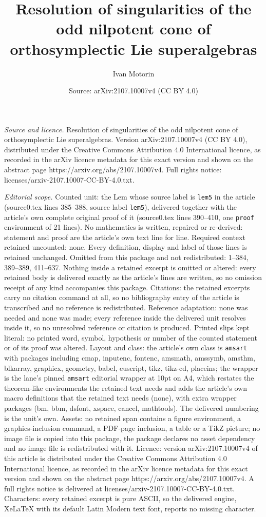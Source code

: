 \documentclass[10pt,a4paper]{amsart}
\title[Resolution of singularities of the odd nilpotent cone of ort]{Resolution of singularities of the odd nilpotent cone of orthosymplectic Lie superalgebras}
\author{Ivan Motorin}
\date{Source: arXiv:2107.10007v4 (CC BY 4.0)}
\begin{document}
\maketitle

\noindent\emph{Source and licence.} Resolution of singularities of the odd nilpotent cone of orthosymplectic Lie superalgebras. Version arXiv:2107.10007v4 (CC BY 4.0), distributed under the Creative Commons Attribution 4.0 International licence, as recorded in the arXiv licence metadata for this exact version and shown on the abstract page https://arxiv.org/abs/2107.10007v4. Full rights notice: licenses/arxiv-2107.10007-CC-BY-4.0.txt.\par\smallskip

\noindent\textit{Editorial scope.} Counted unit: the Lem whose source label is \texttt{lem5} in the article (source0.tex lines 385--388, source label \texttt{lem5}), delivered together with the article's own complete original proof of it (source0.tex lines 390--410, one \texttt{proof} environment of 21 lines). No mathematics is written, repaired or re-derived: statement and proof are the article's own text line for line. Required context retained uncounted: none. Every definition, display and label of those lines is retained unchanged. Omitted from this package and not redistributed: 1--384, 389--389, 411--637. Nothing inside a retained excerpt is omitted or altered: every retained body is delivered exactly as the article's lines are written, so no omission receipt of any kind accompanies this package. Citations: the retained excerpts carry no citation command at all, so no bibliography entry of the article is transcribed and no reference is redistributed. Reference adaptation: none was needed and none was made; every reference inside the delivered unit resolves inside it, so no unresolved reference or citation is produced. Printed slips kept literal: no printed word, symbol, hypothesis or number of the counted statement or of its proof was altered. Layout and class: the article's own class is \texttt{amsart} with packages including cmap, inputenc, fontenc, amsmath, amssymb, amsthm, blkarray, graphicx, geometry, babel, euscript, tikz, tikz-cd, placeins; the wrapper is the lane's pinned \texttt{amsart} editorial wrapper at 10pt on A4, which restates the theorem-like environments the retained text needs and adds the article's own macro definitions that the retained text needs (none), with extra wrapper packages (bm, bbm, dsfont, xspace, cancel, mathtools). The delivered numbering is the unit's own. Assets: no retained span contains a figure environment, a graphics-inclusion command, a PDF-page inclusion, a table or a TikZ picture; no image file is copied into this package, the package declares no asset dependency and no image file is redistributed with it. Licence: version arXiv:2107.10007v4 of this article is distributed under the Creative Commons Attribution 4.0 International licence, as recorded in the arXiv licence metadata for this exact version and shown on the abstract page https://arxiv.org/abs/2107.10007v4. A full rights notice is delivered at licenses/arxiv-2107.10007-CC-BY-4.0.txt. Characters: every retained excerpt is pure ASCII, so the delivered engine, XeLaTeX with its default Latin Modern text font, reports no missing character.
\end{document}
